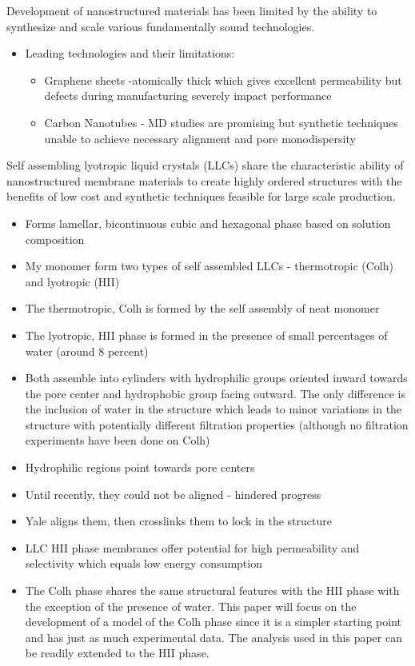 \documentclass{article}
\begin{document}
	Development of nanostructured materials has been limited by the ability to synthesize and scale various fundamentally sound technologies.
	\begin{itemize}
		\item Leading technologies and their limitations:
		\begin{itemize}
			\item Graphene sheets -atomically thick which gives excellent permeability but defects during manufacturing severely impact performance
			\item Carbon Nanotubes - MD studies are promising but synthetic techniques unable to achieve necessary alignment and pore monodispersity
		\end{itemize}
	\end{itemize} 
	Self assembling lyotropic liquid crystals (LLCs) share the characteristic ability of nanostructured membrane materials to create highly ordered structures with the benefits of low cost and synthetic techniques feasible for large scale production.
	\begin{itemize}
		\item Forms lamellar, bicontinuous cubic and hexagonal phase based on solution composition
		\item My monomer form two types of self assembled LLCs - thermotropic (Colh) and lyotropic (HII) 
		\item The thermotropic, Colh is formed by the self assembly of neat monomer
		\item The lyotropic, HII phase is formed in the presence of small percentages of water (around 8 percent)
		\item Both assemble into cylinders with hydrophilic groups oriented inward towards the pore center and hydrophobic group facing outward. The only difference is the inclusion of water in the structure which leads to minor variations in the structure with potentially different filtration properties (although no filtration experiments have been done on Colh)  
		\item Hydrophilic regions point towards pore centers
		\item Until recently, they could not be aligned - hindered progress
		\item Yale aligns them, then crosslinks them to lock in the structure
		\item LLC HII phase membranes offer potential for high permeability and selectivity which equals low energy consumption
		\item The Colh phase shares the same structural features with the HII phase with the exception of the presence of water. This paper will focus on the development of a model of the Colh phase since it is a simpler starting point and has just as much experimental data. The analysis used in this paper can be readily extended to the HII phase. 
	\end{itemize}
	
\end{document}
